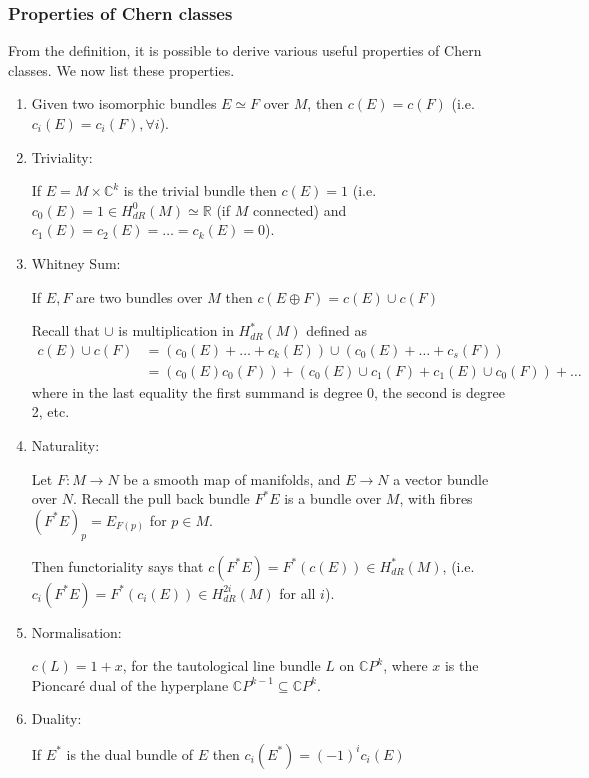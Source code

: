 \documentclass[a4paper]{article}
\theoremstyle{definition} \newtheorem*{definition}{Definition}
\theoremstyle{definition} \newtheorem*{definitions}{Definitions}
\theoremstyle{plain} \newtheorem{theorem}{Theorem}[section]
\theoremstyle{plain} \newtheorem{proposition}[theorem]{Proposition}
\theoremstyle{plain} \newtheorem{corollary}[theorem]{Corollary}
\theoremstyle{plain} \newtheorem{lemma}[theorem]{Lemma}
\theoremstyle{plain} \newtheorem{example}[theorem]{Example}
\newcommand{\realnos}{\mathbb{R}}
\newcommand{\complexnos}{\mathbb{C}}
\begin{document}
\subsubsection{Properties of Chern classes}
From the definition, it is possible to derive various useful properties of Chern classes. We now list these properties.
\begin{enumerate}
    \item Given two isomorphic bundles $E\simeq F$ over $M$, then $c(E)=c(F)$ (i.e. $c_i(E)=c_i(F), \forall i$).

    \item Triviality:

    If $E=M\times \complexnos^k$ is the trivial bundle then $c(E)=1$ (i.e. $c_0(E)=1\in H^0_{dR}(M)\simeq \realnos$ (if $M$ connected) and $c_1(E)=c_2(E)=\ldots =c_k(E)=0$). 

    \item Whitney Sum:

    If $E, F$ are two bundles over $M$ then
    $c(E\oplus F) = c(E) \cup c(F)$
    
    Recall that $\cup$ is multiplication in $H^*_{dR}(M)$ defined as
    \begin{align*}
        c(E) \cup c(F) & = (c_0(E)+\ldots + c_{k}(E)) \cup (c_0(E)+\ldots + c_{s}(F)) \\
        & = (c_0(E) c_0(F)) + (c_0(E)\cup c_1(F) + c_1(E)\cup c_0(F)) + \ldots
    \end{align*}
    where in the last equality the first summand is degree 0, the second is degree 2, etc. 
    
    \item Naturality:

    Let $F:M\to N$ be a smooth map of manifolds, and $E\to N$ a vector bundle over $N$. Recall the pull back bundle $F^*E$ is a bundle over $M$, with fibres $(F^*E)_p=E_{F(p)}$ for $p\in M$. 
    
    Then functoriality says that 
    $c(F^* E) = F^*(c(E)) \in H^*_{dR}(M)$, (i.e. $c_i(F^* E) = F^*(c_i(E)) \in H^{2i}_{dR}(M)$ for all $i$).
    
    \item Normalisation:

    $c(L)=1+x$, for the tautological line bundle $L$ on $\complexnos P^k$, where $x$ is the Pioncar{\' e} dual of the hyperplane $\complexnos P^{k-1} \subseteq \complexnos P^k$. 

    \item Duality:

    If $E^*$ is the dual bundle of $E$ then $c_i(E^*)=(-1)^ic_i(E)$

\end{enumerate}
\end{document}
